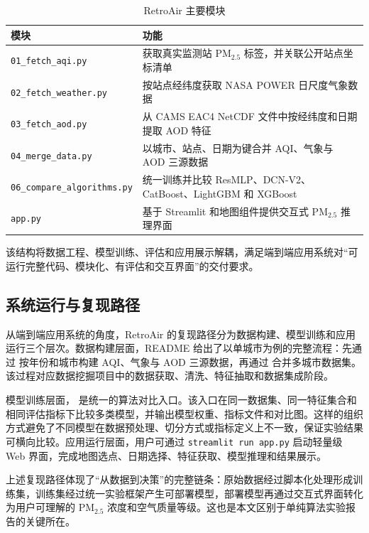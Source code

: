 \documentclass[UTF8,zihao=-4,a4paper]{ctexart}
\newcommand{\pmfine}{PM$_{2.5}$}
\newcommand{\aod}{AOD}
\begin{document}
\begin{table}[H]
  \centering
  \caption{RetroAir 主要模块}
  \label{tab:modules}
  \begin{tabularx}{\textwidth}{lX}
    \toprule
    模块 & 功能 \\
    \midrule
    \texttt{01\_fetch\_aqi.py} & 获取真实监测站 \pmfine{} 标签，并关联公开站点坐标清单 \\
    \texttt{02\_fetch\_weather.py} & 按站点经纬度获取 NASA POWER 日尺度气象数据 \\
    \texttt{03\_fetch\_aod.py} & 从 CAMS EAC4 NetCDF 文件中按经纬度和日期提取 \aod{} 特征 \\
    \texttt{04\_merge\_data.py} & 以城市、站点、日期为键合并 AQI、气象与 \aod{} 三源数据 \\
    \texttt{06\_compare\_algorithms.py} & 统一训练并比较 ResMLP、DCN-V2、CatBoost、LightGBM 和 XGBoost \\
    \texttt{app.py} & 基于 Streamlit 和地图组件提供交互式 \pmfine{} 推理界面 \\
    \bottomrule
  \end{tabularx}
\end{table}

该结构将数据工程、模型训练、评估和应用展示解耦，满足端到端应用系统对“可运行完整代码、模块化、有评估和交互界面”的交付要求。

\subsection{系统运行与复现路径}

从端到端应用系统的角度，RetroAir 的复现路径分为数据构建、模型训练和应用运行三个层次。数据构建层面，README 给出了以单城市为例的完整流程：先通过  按年份和城市构建 AQI、气象与 \aod{} 三源数据，再通过  合并多城市数据集。该过程对应数据挖掘项目中的数据获取、清洗、特征抽取和数据集成阶段。

模型训练层面， 是统一的算法对比入口。该入口在同一数据集、同一特征集合和相同评估指标下比较多类模型，并输出模型权重、指标文件和对比图。这样的组织方式避免了不同模型在数据预处理、切分方式或指标定义上不一致，保证实验结果可横向比较。应用运行层面，用户可通过 \texttt{streamlit run app.py} 启动轻量级 Web 界面，完成地图选点、日期选择、特征获取、模型推理和结果展示。

上述复现路径体现了“从数据到决策”的完整链条：原始数据经过脚本化处理形成训练集，训练集经过统一实验框架产生可部署模型，部署模型再通过交互式界面转化为用户可理解的 \pmfine{} 浓度和空气质量等级。这也是本文区别于单纯算法实验报告的关键所在。
\end{document}
